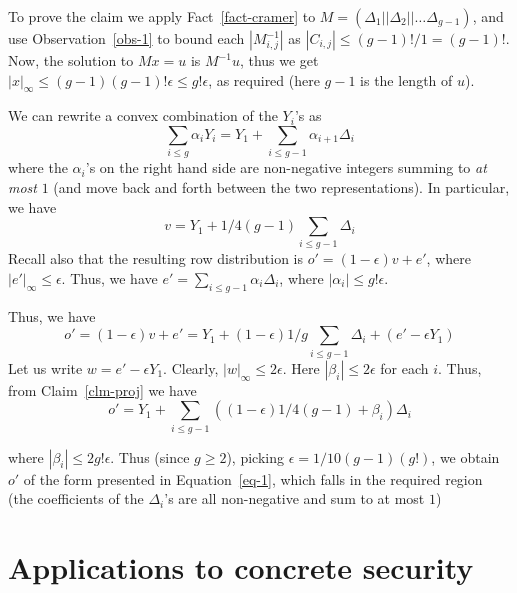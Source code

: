 \documentclass[a4paper]{article}
\begin{document}
To prove the claim we apply Fact~\ref{fact-cramer} to $M=(\Delta_1||\Delta_2||\ldots \Delta_{g-1})$, and use Observation~\ref{obs-1} to bound each $|{M}^{-1}_{i,j}|$ as $|C_{i,j}|\leq (g-1)!/1=(g-1)!$. Now, the solution to $Mx=u$ is $M^{-1}u$, thus we get $|x|_\infty\leq (g-1)(g-1)!\epsilon\leq g!\epsilon$, as required (here $g-1$ is the length of $u$).

We can rewrite a convex combination of the $Y_i$'s as
\begin{equation}\label{eq-1}
\sum_{i\leq g}\alpha_iY_i=Y_1+\sum_{i\leq g-1}\alpha_{i+1} \Delta_i
\end{equation}
where the $\alpha_i$'s on the right hand side are non-negative integers summing to \emph{at most} $1$ (and move back and forth between the two representations). In particular, we have
\[v = Y_1+1/4(g-1)\sum_{i\leq g-1}\Delta_i\]
Recall also that the resulting row distribution is
$o'=(1-\epsilon)v + e'$, where $|e'|_\infty\leq \epsilon$.
Thus, we have $e'=\sum_{i\leq g-1}\alpha_i\Delta_i$, where $|\alpha_i|\leq g!\epsilon$. 

Thus, we have
\[o'=(1-\epsilon)v+e'=Y_1+(1-\epsilon)1/g\sum_{i\leq g-1}\Delta_i+(e'-\epsilon Y_1)\]
Let us write $w=e'-\epsilon Y_1$. Clearly, $|w|_\infty\leq 2\epsilon$.
Here $|\beta_i|\leq 2\epsilon$ for each $i$.
Thus, from Claim~\ref{clm-proj} we have
\[o'= Y_1+\sum_{i\leq g-1}((1-\epsilon)1/4(g-1)+\beta_i)\Delta_i\]

where $|\beta_i|\leq 2g!\epsilon$. Thus (since $g\geq 2$), picking $\epsilon=1/10(g-1)(g!)$, we obtain $o'$ of the form presented in Equation~\ref{eq-1}, which falls in the required region (the coefficients of the $\Delta_i$'s are all non-negative and sum to at most $1$)



\section{Applications to concrete security}
\end{document}
